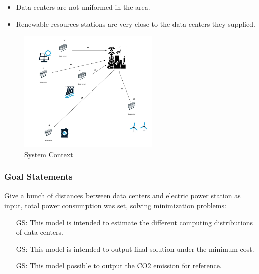 \documentclass[12pt]{article}
\newcounter{goalnum} %
\begin{document}
\begin{itemize}

\item Data centers are not uniformed in the area.

\item Renewable resources stations are very close to the data centers they supplied.

\end{itemize}
\begin{figure}[h!]
\begin{center}
 \includegraphics[width=0.6\textwidth]{distributed model.pdf}
\caption{System Context}
\label{Fig_SystemContext} 
\end{center}
\end{figure}


\subsubsection{Goal Statements}

Give a bunch of distances between data centers and electric power station as input, total power consumption was set, solving minimization problems: 


\begin{itemize}

\item[GS\refstepcounter{goalnum}\thegoalnum \label{G_meaningfulLabel}:] {This model is intended to estimate the different computing distributions of data centers.}
\item[GS\refstepcounter{goalnum}\thegoalnum \label{G_meaningfulLabel}:] {This model is intended to output final solution under the minimum cost.}
\item[GS\refstepcounter{goalnum}\thegoalnum \label{G_meaningfulLabel}:] {This model possible to output the CO2 emission for reference.}
\end{itemize}
\end{document}
